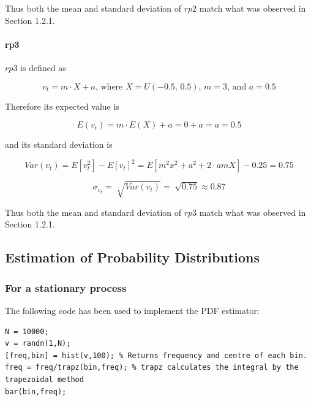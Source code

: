 \documentclass{article}
\begin{document}
Thus both the mean and standard deviation of $rp2$ match what was observed in Section 1.2.1.


\paragraph{rp3}

$rp3$ is defined as

\begin{equation}
v_t=m\cdot X +a \text{, where } X=U(-0.5\text{, }0.5)\text{, }m=3\text{, and }a=0.5
\end{equation}

Therefore its expected value is

\begin{equation}
E(v_t)=m \cdot E(X)+a=0+a=a=0.5
\end{equation}

and its standard deviation is

\begin{equation}
Var(v_t)=E[v_t^2]-E[v_t]^2=E[m^2x^2+a^2+2 \cdot amX] - 0.25 = 0.75
\end{equation}

\begin{equation}
\sigma_{v_t}=\sqrt[]{Var(v_t)}=\sqrt[]{0.75} \approx 0.87
\end{equation}

Thus both the mean and standard deviation of $rp3$ match what was observed in Section 1.2.1.


\vspace{0.5cm}
\subsection{Estimation of Probability Distributions}

\subsubsection{For a stationary process}

The following code has been used to implement the PDF estimator:

\begin{lstlisting}
N = 10000;
v = randn(1,N);
[freq,bin] = hist(v,100); % Returns frequency and centre of each bin.
freq = freq/trapz(bin,freq); % trapz calculates the integral by the trapezoidal method
bar(bin,freq);
\end{lstlisting}
\end{document}
